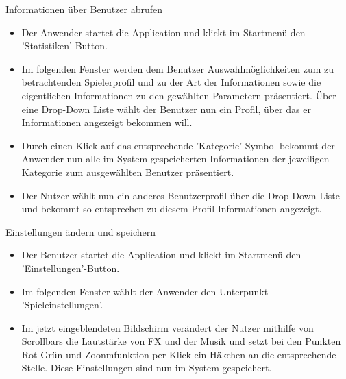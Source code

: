 \begin{requirements}
\begin{itemize}
	\end{itemize}
  	
  	 Informationen über Benutzer abrufen
  	
  	\begin{itemize}
  	
		\item Der Anwender startet die Application und klickt im Startmenü den 'Statistiken'-Button.
		
		\item Im folgenden Fenster werden dem Benutzer Auswahlmöglichkeiten zum zu betrachtenden Spielerprofil und zu der Art der Informationen sowie die eigentlichen Informationen zu den gewählten Parametern präsentiert. Über eine Drop-Down Liste wählt der Benutzer nun ein Profil, über das er Informationen angezeigt bekommen will.
		
		\item Durch einen Klick auf das entsprechende 'Kategorie'-Symbol bekommt der Anwender nun alle im System gespeicherten Informationen der jeweiligen Kategorie zum ausgewählten Benutzer präsentiert.
		
		\item Der Nutzer wählt nun ein anderes Benutzerprofil über die Drop-Down Liste und bekommt so entsprechen zu diesem Profil Informationen angezeigt.
		
  	
  	\end{itemize}
  	
  	 Einstellungen ändern und speichern
  	
  	\begin{itemize}
  	
		\item Der Benutzer startet die Application und klickt im Startmenü den 'Einstellungen'-Button.
		
		\item Im folgenden Fenster wählt der Anwender den Unterpunkt 'Spieleinstellungen'.
		
		\item Im jetzt eingeblendeten Bildschirm verändert der Nutzer mithilfe von Scrollbars die Lautstärke von FX und der Musik und setzt bei den Punkten Rot-Grün und Zoonmfunktion per Klick ein Häkchen an die entsprechende Stelle. Diese Einstellungen sind nun im System gespeichert.
	
  	
  	\end{itemize}
  	
  	
\end{requirements}
  		
